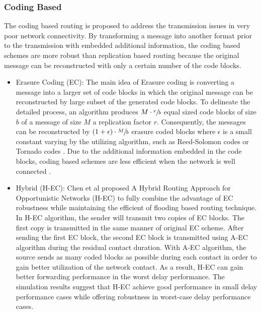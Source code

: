 \subsubsection{Coding Based}
\label{bg:Opportunistic Networks:Classification of Opportunistic Routing:CB}
The coding based routing is proposed to address the transmission issues in very poor network connectivity.
By transforming a message into another format prior to the transmission with embedded additional information, the coding based schemes are more robust than replication based routing because the original message can be reconstructed with only a certain number of the code blocks.
	\begin{itemize}
		\item Erasure Coding (EC):
		The main idea of Erasure coding \cite{Wang2005} is converting a message into a larger set of code blocks in which the original message can be reconstructed by large subset of the generated code blocks.
		To delineate the detailed process, an algorithm produces $ M \cdot \sfrac{r}{b}$ equal sized code blocks of size $b$ of	a message of size $M$ a replication factor $r$.
		Consequently, the messages can be reconstructed by  $(1+\epsilon) \cdot \sfrac{M}{b}$ erasure coded blocks where $\epsilon$ is a small constant 
		varying by the utilizing algorithm, such as Reed-Solomon codes or Tornado codes \cite{Chung2003}.
		Due to the additional information embedded in the code blocks, coding based schemes are less efficient when the network is well connected \cite{Yu2006}.

		\item Hybrid (H-EC):
		Chen et al \cite{Chen2006} proposed A Hybrid Routing Approach for Opportunistic Networks (H-EC) to fully combine the advantage of EC robustness while maintaining the efficient of flooding based routing technique. 
		In H-EC algorithm, the sender will transmit two copies of EC blocks. 
		The first copy is transmitted in the same manner of original EC scheme.
		After sending the first EC block, the second EC block is transmitted using A-EC algorithm during the residual contact duration. 
		With A-EC algorithm, the source sends as many coded blocks as possible during each contact in order to gain better utilization of the network contact.
		As a result, H-EC can gain better forwarding performance in the worst delay performance.
		The simulation results suggest that H-EC achieve good performance in small delay performance cases while offering robustness in worst-case delay performance cases.
	\end{itemize}


